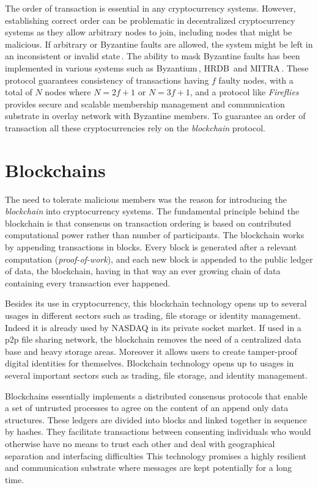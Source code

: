 \documentclass[USenglish]{uit-thesis}
\begin{document}
The order of transaction is essential in any cryptocurrency systems. 
However, establishing correct order can be problematic in
decentralized cryptocurrency systems as they allow 
arbitrary nodes to join, including nodes that might be malicious.
If arbitrary or Byzantine faults are allowed, the system might be left in an inconsistent or invalid state\,\cite{Lamport1982}.
The ability to mask Byzantine faults has been implemented in various systems such as
Byzantium\,\cite{Garcia:2011:EMB}, HRDB\,\cite{vandiver2007hrdb} and MITRA\,\cite{Luiz:2014:MBF}.
These protocol guarantees consistency of transactions having
$f$ faulty nodes, with a total of $N$ nodes where $N=2f+1$ or $N=3f+1$, and
a protocol like \emph{Fireflies}\,\cite{Johansen2015Fireflies} provides secure and
scalable membership management and communication substrate in overlay
network with Byzantine members. To guarantee an order of
transaction all these cryptocurrencies rely on the \emph{blockchain} protocol.

\section{Blockchains}
\label{sec:blockchains}
The need to tolerate malicious members was the reason for introducing
the \emph{blockchain} into cryptocurrency systems. The fundamental principle 
behind the blockchain is that consensus on transaction ordering is based on 
contributed computational power rather than number of participants. 
The blockchain works by appending
transactions in blocks. Every block is generated after a relevant computation
(\emph{proof-of-work}),
and each new block is appended to the public ledger of data,
the blockchain, having in that way an ever growing chain of data
containing every transaction ever happened.

Besides its use in cryptocurrency, this blockchain technology
opens up to several usages in different sectors such as
trading, file storage or identity management. Indeed it is already
used by NASDAQ in its private socket market.  If used in a \gls{p2p}
file sharing network, the blockchain removes the need of a centralized
data base and heavy storage areas. Moreover it allows users to create
tamper-proof digital identities for themselves.
Blockchain technology opens up to usages in several important sectors
such as trading, file storage, and identity management.

Blockchains essentially implements a distributed consensus protocols that enable a set of untrusted processes to agree on the content of an append only data structures. 
These ledgers are divided into blocks and linked together in sequence by hashes. 
They facilitate transactions between consenting individuals who would otherwise have no means to trust each other and deal with geographical separation and interfacing difficulties 
This technology promises a highly resilient and communication substrate where messages are kept potentially for a long time.
\end{document}
